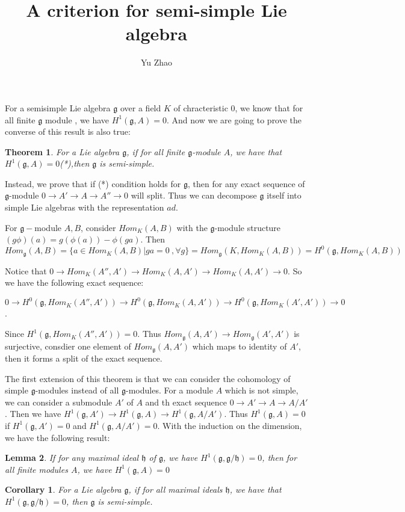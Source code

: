 \documentclass[10pt,letterpaper]{article}
\makeatletter
\newcommand\course[1]{\renewcommand\@course{#1}}
\newcommand\@course{}
\newcommand\term[1]{\renewcommand\@term{#1}}
\newcommand\@term{}
\theoremstyle{plain}
\newtheorem{thm}{Theorem}[section]
\newtheorem{lem}[thm]{Lemma}
\newtheorem*{cor}{Corollary}
\theoremstyle{definition}
\theoremstyle{remark}
\makeatother
\begin{document}
\course{Representations of Lie groups}
\term{}
\title{A criterion for semi-simple Lie algebra}
\author{Yu Zhao}
\maketitle

For a semisimple Lie algebra $\mathfrak{g}$ over a field $K$ of chracteristic $0$, we know that for all finite $\mathfrak{g}$ module , we have $H^{1}(\mathfrak{g}, A)=0$. And now we are going to prove the converse of this result is also true:

\begin{thm} For a Lie algebra $\mathfrak{g}$, if for all finite $\mathfrak{g}$-module $A$, we have that $H^{1}(\mathfrak{g}, A)=0$(*),then $\mathfrak{g}$ is semi-simple.
\end{thm}


Instead, we prove that if (*) condition holds for $\mathfrak{g}$, then for any exact sequence of $\mathfrak{g}$-module $0\to A' \to A \to A''\to 0$ will split. Thus we can decompose $\mathfrak{g}$ itself into simple Lie algebras with the representation $ad$.

For $\mathfrak{g}-$module $A,B$, consider $Hom_{K}(A,B)$ with the $\mathfrak{g}$-module structure $(g\phi)(a)=g(\phi(a))-\phi(ga)$. Then $Hom_{\mathfrak{g}}(A,B)=\{a\in Hom_{K}(A,B)| ga=0 \ , \forall g\}=Hom_{\mathfrak{g}}(K,Hom_{K}(A,B))=H^{0}(\mathfrak{g},Hom_{K}(A,B))$

Notice that $0\to Hom_{K}(A'',A')\to Hom_{K}(A,A') \to Hom_{K}(A,A')\to 0$. So we have the following exact sequence:


$0\to H^{0}(\mathfrak{g},Hom_{K}(A'',A'))\to H^{0}(\mathfrak{g},Hom_{K}(A,A'))  \to H^{0}(\mathfrak{g},Hom_{K}(A',A'))\to 0$. 

Since $H^{1}(\mathfrak{g}, Hom_{K}(A'',A'))=0$. Thus $Hom_{\mathfrak{g}}(A,A')\to Hom_{\mathfrak{g}}(A',A')$ is surjective, consdier one element of  $Hom_{\mathfrak{g}}(A,A')$ which maps to identity of $A'$, then it forms a split of the exact sequence.

The first extension of this theorem is that we can consider the cohomology of simple $\mathfrak{g}$-modules instead of all $\mathfrak{g}$-modules. For a module $A$ which is not simple, we can  consider a submodule $A'$ of $A$ and th exact sequence $0\to A' \to A \to A/A'$. Then we have $H^{1}(\mathfrak{g}, A')\to H^{1}(\mathfrak{g}, A) \to H^{1}(\mathfrak{g}, A/A')$. Thus $H^{1}(\mathfrak{g}, A)=0$ if $H^{1}(\mathfrak{g}, A')=0$ and $ H^{1}(\mathfrak{g}, A/A')=0$. With the induction on the dimension, we have the following result:

\begin{lem}
  If for any maximal ideal $\mathfrak{h}$ of $\mathfrak{g}$, we have $H^{1}(\mathfrak{g},\mathfrak{g}/\mathfrak{h})=0$, then for all finite modules $A$, we have $H^{1}(\mathfrak{g},A)=0$
\end{lem}

\begin{cor}
   For a Lie algebra $\mathfrak{g}$, if for all maximal ideals  $\mathfrak{h}$, we have that $H^{1}(\mathfrak{g}, \mathfrak{g}/\mathfrak{h})=0$, then $\mathfrak{g}$ is semi-simple.
\end{cor}
\end{document}
